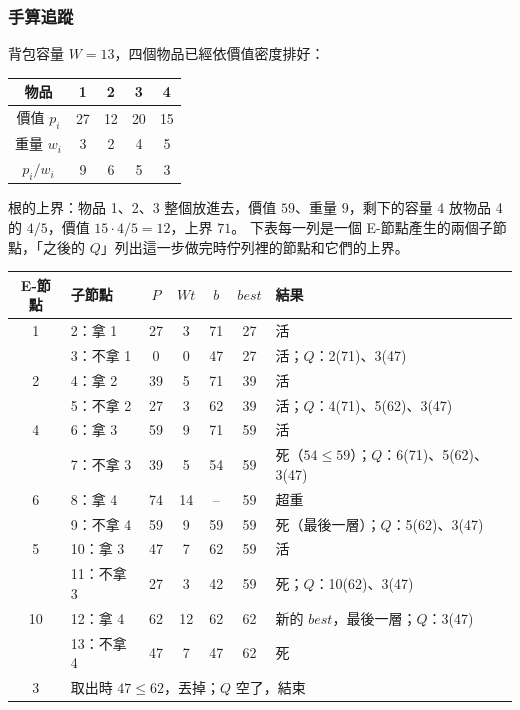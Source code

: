 \subsubsection{手算追蹤}

背包容量 $W = 13$，四個物品已經依價值密度排好：

\begin{center}
\begin{tabular}{ccccc}
\toprule
物品 & 1 & 2 & 3 & 4 \\
\midrule
價值 $p_i$ & 27 & 12 & 20 & 15 \\
重量 $w_i$ & 3 & 2 & 4 & 5 \\
$p_i / w_i$ & 9 & 6 & 5 & 3 \\
\bottomrule
\end{tabular}
\end{center}

根的上界：物品 1、2、3 整個放進去，價值 $59$、重量 $9$，剩下的容量 $4$ 放物品 4 的
$4/5$，價值 $15 \cdot 4/5 = 12$，上界 $71$。 下表每一列是一個 E-節點產生的兩個子節點，「之後的
$Q$」列出這一步做完時佇列裡的節點和它們的上界。

\begin{center}
\small
\begin{tabular}{clccccl}
\toprule
E-節點 & 子節點 & $P$ & $\mathit{Wt}$ & $b$ & $\mathit{best}$ & 結果 \\
\midrule
1 & 2：拿 1 & 27 & 3 & 71 & 27 & 活 \\
 & 3：不拿 1 & 0 & 0 & 47 & 27 & 活；$Q$：2(71)、3(47) \\
\midrule
2 & 4：拿 2 & 39 & 5 & 71 & 39 & 活 \\
 & 5：不拿 2 & 27 & 3 & 62 & 39 & 活；$Q$：4(71)、5(62)、3(47) \\
\midrule
4 & 6：拿 3 & 59 & 9 & 71 & 59 & 活 \\
 & 7：不拿 3 & 39 & 5 & 54 & 59 & 死（$54 \le 59$）；$Q$：6(71)、5(62)、3(47) \\
\midrule
6 & 8：拿 4 & 74 & 14 & -- & 59 & 超重 \\
 & 9：不拿 4 & 59 & 9 & 59 & 59 & 死（最後一層）；$Q$：5(62)、3(47) \\
\midrule
5 & 10：拿 3 & 47 & 7 & 62 & 59 & 活 \\
 & 11：不拿 3 & 27 & 3 & 42 & 59 & 死；$Q$：10(62)、3(47) \\
\midrule
10 & 12：拿 4 & 62 & 12 & 62 & 62 & 新的 $\mathit{best}$，最後一層；$Q$：3(47) \\
 & 13：不拿 4 & 47 & 7 & 47 & 62 & 死 \\
\midrule
3 & \multicolumn{6}{l}{取出時 $47 \le 62$，丟掉；$Q$ 空了，結束} \\
\bottomrule
\end{tabular}
\end{center}

